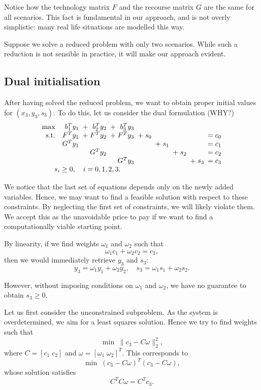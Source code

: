 {Notice how the technology matrix $F$ and the recourse matrix 
$G$ are the same for all scenarios. This fact is fundamental 
in our approach, and is not overly simplistic: many real life 
situations are modelled this way. 

Suppose we solve a reduced problem with only two scenarios. 
While such a reduction is not sensible in practice, it will 
make our approach evident.

%
%
\subsection{Dual initialisation}

After having solved the reduced problem, we want to obtain 
proper initial values for $(x_3, y_3, s_3)$. To do this, let 
us consider the dual formulation (WHY?)
\[
\begin{array}{rrrrllllll}
\max & b_1^T y_1 & \!\!\! + \;\,\, b_2^T y_2 & \!\!\! + \;\,\, b_3^T y_3 \\
\mbox{s.t.} & F^T y_1 & \!\!\! + \; F^Ty_2 & \!\!\! +\; F^Ty_3 & \!\!\! +\; s_0 &&&& \!\!\!= c_0 \\
            & G^T y_1 &&&& \!\!\! + \; s_1 &&&  \!\!\!= c_1 \\
            && G^T y_2 &&&&  \!\!\! + \; s_2 && \!\!\!= c_2 \\
            &&& G^T y_3 &&&& \!\!\! + \; s_3 &  \!\!\!= c_3 \\
            &&&&&&&& \hspace{-7.8cm} s_i \ge 0, \quad i = 0, 1, 2, 3.
\end{array}
\]

We notice that the last set of equations depends only on the 
newly added variables. Hence, we may want to find a feasible 
solution with respect to these constraints. By neglecting the 
first set of constraints, we will likely violate them. We accept 
this as the unavoidable price to pay if we want to find a 
computationally viable starting point.

By linearity, if we find weights $\omega_1$ and $\omega_2$ such that
\[
  \omega_1 c_1 + \omega_2 c_2 = c_3,
\]
then we would immediately retrieve $y_3$ and $s_3$:
\[
  y_3 = \omega_1 y_1 + \omega_2 y_2, \quad s_3 = \omega_1 s_1 + \omega_2 s_2.
\]

However, without imposing conditions on $\omega_1$ and $\omega_2$, 
we have no guarantee to obtain $s_3 \ge 0$.

Let us first consider the unconstrained subproblem. As the system 
is overdetermined, we aim for a least squares solution. Hence we 
try to find weights such that
\[
  \min \; \| c_3 - C\omega\|_2^2,
\]
where $C = [c_1 \; c_2]$ and $\omega = [\omega_1 \; \omega_2]^T$. 
This corresponds to
\[
  \min \; (c_3 - C\omega)^T(c_3 - C\omega),
\]
whose solution satisfies
\[
  C^T C\omega = C^T c_3.
\]

}
